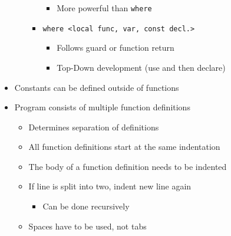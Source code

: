 \begin{itemize}
\begin{itemize}
\begin{itemize}
\begin{itemize}
                            \item More powerful than \verb+where+
                        \end{itemize}
                    \item \verb+where <local func, var, const decl.>+
                        \begin{itemize}
                            \item Follows guard or function return
                            \item Top-Down development (use and then declare)
                        \end{itemize}
                \end{itemize}
        \end{itemize}
    \item Constants can be defined outside of functions
    \item Program consists of multiple function definitions
        \begin{itemize}
            \item Determines separation of definitions
            \item All function definitions start at the same indentation
            \item The body of a function definition needs to be indented
            \item If line is split into two, indent new line again
                \begin{itemize}
                    \item Can be done recursively
                \end{itemize}
            \item Spaces have to be used, not tabs
        \end{itemize}
\end{itemize}

